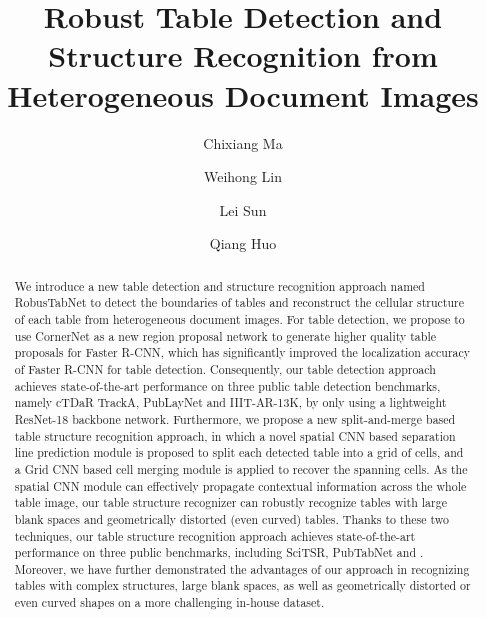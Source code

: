 \documentclass[final,3p,times,twocolumn]{elsarticle}
\begin{document}
\makeatletter
\def\ps@pprintTitle{\let\@oddhead\@empty
  \let\@evenhead\@empty
  \let\@oddfoot\@empty
  \let\@evenfoot\@oddfoot
}
\makeatother

\begin{frontmatter}

\title{Robust Table Detection and Structure Recognition from \\ Heterogeneous Document Images}

\author[address1]{Chixiang Ma}

\author[address2]{Weihong Lin}

\author[address2]{Lei Sun}

\author[address2]{Qiang Huo}

\address[address1]{Department of EEIS, University of Science and Technology of China, Hefei, 230026, China}
\address[address2]{Microsoft Research Asia, Beijing, 100080, China}

\begin{abstract}
We introduce a new table detection and structure recognition approach named RobusTabNet to detect the boundaries of tables and reconstruct the cellular structure of each table from heterogeneous document images. For table detection, we propose to use CornerNet as a new region proposal network to generate higher quality table proposals for Faster R-CNN, which has significantly improved the localization accuracy of Faster R-CNN for table detection. Consequently, our table detection approach achieves state-of-the-art performance on three public table detection benchmarks, namely cTDaR TrackA, PubLayNet and IIIT-AR-13K, by only using a lightweight ResNet-18 backbone network. Furthermore, we propose a new split-and-merge based table structure recognition approach, in which a novel spatial CNN based separation line prediction module is proposed to split each detected table into a grid of cells, and a Grid CNN based cell merging module is applied to recover the spanning cells. As the spatial CNN module can effectively propagate contextual information across the whole table image, our table structure recognizer can robustly recognize tables with large blank spaces and geometrically distorted (even curved) tables. Thanks to these two techniques, our table structure recognition approach achieves state-of-the-art performance on three public benchmarks, including SciTSR, PubTabNet and {\color{black}{cTDaR TrackB2-Modern}}. Moreover, we have further demonstrated the advantages of our approach in recognizing tables with complex structures, large blank spaces, as well as geometrically distorted or even curved shapes on a more challenging in-house dataset.
\end{abstract}


\end{frontmatter}
\end{document}
